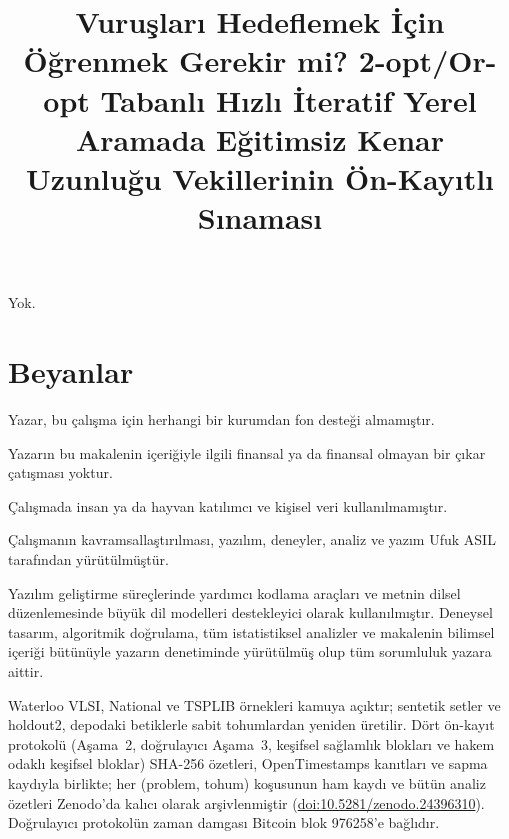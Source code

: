 \documentclass[pdflatex,sn-basic]{sn-jnl}
\begin{document}
\title[Vuruş hedeflemede öğrenme gerekli mi?]{Vuruşları Hedeflemek İçin Öğrenmek Gerekir mi? 2-opt/Or-opt
Tabanlı Hızlı İteratif Yerel Aramada Eğitimsiz Kenar Uzunluğu Vekillerinin Ön-Kayıtlı Sınaması}

\author*[1]{ }



\maketitle









\backmatter

Yok.

\section*{Beyanlar}

Yazar, bu çalışma için herhangi bir kurumdan fon desteği almamıştır.

Yazarın bu makalenin içeriğiyle ilgili finansal ya da finansal olmayan bir çıkar çatışması
yoktur.

Çalışmada insan ya da hayvan katılımcı ve kişisel veri kullanılmamıştır.

Çalışmanın kavramsallaştırılması, yazılım, deneyler, analiz ve yazım Ufuk ASIL tarafından
yürütülmüştür.

Yazılım geliştirme süreçlerinde yardımcı kodlama araçları ve metnin dilsel düzenlemesinde büyük
dil modelleri destekleyici olarak kullanılmıştır. Deneysel tasarım, algoritmik doğrulama, tüm
istatistiksel analizler ve makalenin bilimsel içeriği bütünüyle yazarın denetiminde yürütülmüş
olup tüm sorumluluk yazara aittir.

Waterloo VLSI, National ve TSPLIB örnekleri kamuya açıktır; sentetik setler ve holdout2, depodaki
betiklerle sabit tohumlardan yeniden üretilir. Dört ön-kayıt protokolü (Aşama~2, doğrulayıcı Aşama~3,
keşifsel sağlamlık blokları ve hakem odaklı keşifsel bloklar) SHA-256 özetleri, OpenTimestamps kanıtları ve sapma kaydıyla
birlikte; her (problem, tohum) koşusunun ham kaydı ve bütün analiz özetleri Zenodo'da kalıcı olarak
arşivlenmiştir (\href{https://doi.org/10.5281/zenodo.24396310}{doi:10.5281/zenodo.24396310}).
Doğrulayıcı protokolün zaman damgası Bitcoin blok 976258'e bağlıdır.
\end{document}
